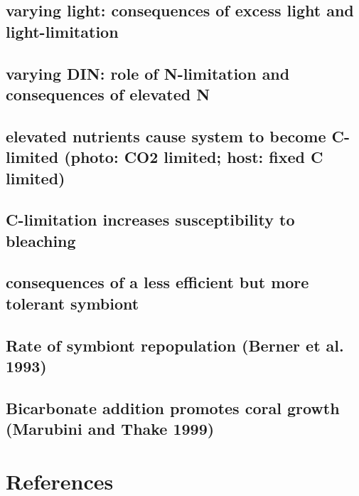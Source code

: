 \documentclass[]{elsarticle} %
\begin{document}
\subsection{varying light: consequences of excess light and
light-limitation}\label{varying-light-consequences-of-excess-light-and-light-limitation}

\subsection{varying DIN: role of N-limitation and consequences of
elevated
N}\label{varying-din-role-of-n-limitation-and-consequences-of-elevated-n}

\subsection{elevated nutrients cause system to become C-limited (photo:
CO2 limited; host: fixed C
limited)}\label{elevated-nutrients-cause-system-to-become-c-limited-photo-co2-limited-host-fixed-c-limited}

\subsection{C-limitation increases susceptibility to
bleaching}\label{c-limitation-increases-susceptibility-to-bleaching}

\subsection{consequences of a less efficient but more tolerant
symbiont}\label{consequences-of-a-less-efficient-but-more-tolerant-symbiont}

\subsection{Rate of symbiont repopulation (Berner et al.
1993)}\label{rate-of-symbiont-repopulation-berner-et-al.-1993}

\subsection{Bicarbonate addition promotes coral growth (Marubini and
Thake
1999)}\label{bicarbonate-addition-promotes-coral-growth-marubini-and-thake-1999}

\section*{References}\label{references}
\end{document}
